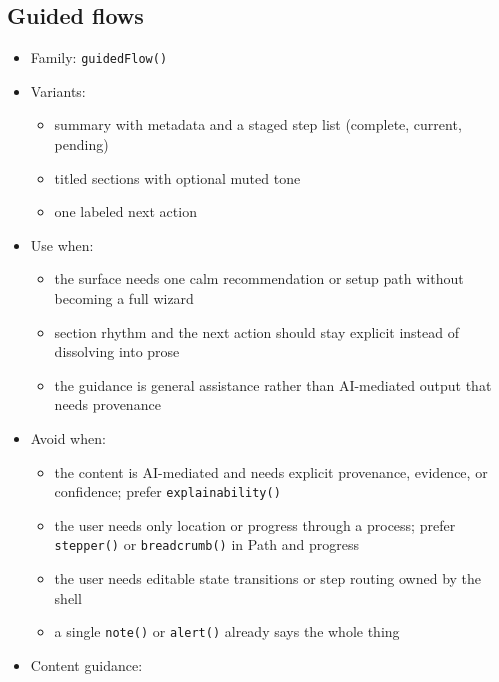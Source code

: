 \subsection{Guided flows}\label{record-019-guided-flows}

\begin{itemize}
\tightlist
\item
  Family: \texttt{g\allowbreak{}u\allowbreak{}i\allowbreak{}d\allowbreak{}e\allowbreak{}d\allowbreak{}F\allowbreak{}l\allowbreak{}o\allowbreak{}w\allowbreak{}(\allowbreak{})\allowbreak{}}
\item
  Variants:

  \begin{itemize}
  \tightlist
  \item
    summary with metadata and a staged step list (complete, current, pending)
  \item
    titled sections with optional muted tone
  \item
    one labeled next action
  \end{itemize}
\item
  Use when:

  \begin{itemize}
  \tightlist
  \item
    the surface needs one calm recommendation or setup path without becoming a full wizard
  \item
    section rhythm and the next action should stay explicit instead of dissolving into prose
  \item
    the guidance is general assistance rather than AI-mediated output that needs provenance
  \end{itemize}
\item
  Avoid when:

  \begin{itemize}
  \tightlist
  \item
    the content is AI-mediated and needs explicit provenance, evidence, or confidence; prefer \texttt{e\allowbreak{}x\allowbreak{}p\allowbreak{}l\allowbreak{}a\allowbreak{}i\allowbreak{}n\allowbreak{}a\allowbreak{}b\allowbreak{}i\allowbreak{}l\allowbreak{}i\allowbreak{}t\allowbreak{}y\allowbreak{}(\allowbreak{})\allowbreak{}}
  \item
    the user needs only location or progress through a process; prefer \texttt{s\allowbreak{}t\allowbreak{}e\allowbreak{}p\allowbreak{}p\allowbreak{}e\allowbreak{}r\allowbreak{}(\allowbreak{})\allowbreak{}} or \texttt{b\allowbreak{}r\allowbreak{}e\allowbreak{}a\allowbreak{}d\allowbreak{}c\allowbreak{}r\allowbreak{}u\allowbreak{}m\allowbreak{}b\allowbreak{}(\allowbreak{})\allowbreak{}} in Path and progress
  \item
    the user needs editable state transitions or step routing owned by the shell
  \item
    a single \texttt{n\allowbreak{}o\allowbreak{}t\allowbreak{}e\allowbreak{}(\allowbreak{})\allowbreak{}} or \texttt{a\allowbreak{}l\allowbreak{}e\allowbreak{}r\allowbreak{}t\allowbreak{}(\allowbreak{})\allowbreak{}} already says the whole thing
  \end{itemize}
\item
  Content guidance:


\end{itemize}
